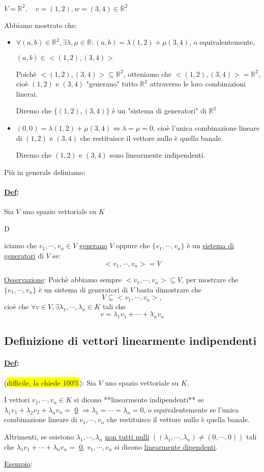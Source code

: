 \documentclass{article}
\newcommand{\hl}[1]{\colorbox{yellow}{#1}}
\newcommand{\ul}[1]{\underline{#1}}
\newcommand{\R}{\mathbb{R}}
\newcommand{\Def}[2]{\paragraph{\ul{Def}:}#1\\\hspace*{3em}\begin{minipage}{.8\textwidth}#2\end{minipage}}
\begin{document}
$V=\R^2,\quad v=(1,2),w=(3,4)\in\R^2$

Abbiamo mostrato che:
\begin{itemize}
	\item $\forall(a,b)\in\R^2,\exists\lambda,\mu\in\R:(a,b)=\lambda(1,2)+\mu(3,4)$, o equivalentemente,

	      $(a,b)\in<(1,2),(3,4)>$

	      Poichè $<(1,2),(3,4)>\subseteq\R^2$, otteniamo che $<(1,2),(3,4)>=\R^2$, cioè $(1,2)$ e $(3,4)$ "generano" tutto $\R^2$ attraverso le loro combinazioni linerai.

	      Diremo che $\{(1,2),(3,4)\}$ è un "sistema di generatori" di $\R^2$
	\item $(0,0)=\lambda(1,2)+\mu(3,4)\Leftrightarrow\lambda=\mu=0$, cioè l'unica combinazione lineare di $(1,2)$ e $(3,4)$ che restituisce il vettore nullo è quella banale.

	      Diremo che $(1,2)$ e $(3,4)$ sono linearmente indipendenti.
\end{itemize}

Più in generale definiamo:

\Def{Sia $V$ uno spazio vettoriale su $K$}

Diciamo che $v_1,\cdots,v_n\in V$ \ul{generano} $V$ oppure che $\{v_1,\cdots,v_n\}$ è un \ul{sistema di generatori} di $V$ se:
$$<v_1,\cdots,v_n>=V$$

\ul{Osservazione}: Poichè abbiamo sempre $<v_1,\cdots,v_n>\subseteq V$, per mostrare che $\{v_1,\cdots,v_n\}$ è un sistema di generatori di $V$ basta dimostrare che
$$V\subseteq<v_1,\cdots,v_n>,$$
cioè che $\forall v\in V,\exists\lambda_1,\cdots,\lambda_n\in K$ tali che
$$v=\lambda_1v_1+\cdots+\lambda_nv_n$$

\subsection{Definizione di vettori linearmente indipendenti}
\Def{(\hl{difficile, la chiede 100\%}): Sia $V$ uno spazio vettoriale su $K$.}{
	I vettori $v_1,\cdots,v_n\in K$ si dicono **linearmente indipendenti** se
	$\lambda_1v_1+\lambda_2v_2+\lambda_nv_n=$ \ul{0} $\Rightarrow\lambda_1=\cdots=\lambda_n=0$, o equivalentemente se l'unica combinazione lineare di $v_1,\cdots,v_n$ che restituisce il vettore nullo è quella banale.

	Altrimenti, se esistono $\lambda_1,\cdots,\lambda_n$ \ul{non tutti nulli} $((\lambda_1,\cdots,\lambda_n)\not=(0,\cdots,0))$ tali che $\lambda_1v_1+\cdots+\lambda_nv_n=$ \ul{0}, $v_1,\cdots,v_n$ si dicono \ul{linearmente dipendenti}.
}
\ul{Esempio}:
\end{document}
